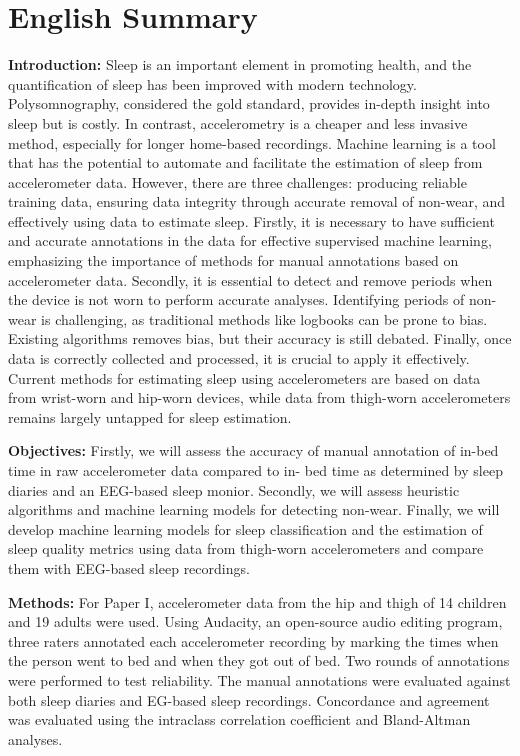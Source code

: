 \documentclass[
  10pt,
]{scrbook}
\let\originaltextbf\textbf
\renewcommand{\textbf}[1]{\textcolor{color1}{\textsf{\originaltextbf{#1}}}}
\begin{document}
\hypertarget{english-summary}{%
\chapter{English Summary}\label{english-summary}}

\textbf{Introduction:} Sleep is an important element in promoting
health, and the quantification of sleep has been improved with modern
technology. Polysomnography, considered the gold standard, provides
in-depth insight into sleep but is costly. In contrast, accelerometry is
a cheaper and less invasive method, especially for longer home-based
recordings. Machine learning is a tool that has the potential to
automate and facilitate the estimation of sleep from accelerometer data.
However, there are three challenges: producing reliable training data,
ensuring data integrity through accurate removal of non-wear, and
effectively using data to estimate sleep. Firstly, it is necessary to
have sufficient and accurate annotations in the data for effective
supervised machine learning, emphasizing the importance of methods for
manual annotations based on accelerometer data. Secondly, it is
essential to detect and remove periods when the device is not worn to
perform accurate analyses. Identifying periods of non-wear is
challenging, as traditional methods like logbooks can be prone to bias.
Existing algorithms removes bias, but their accuracy is still debated.
Finally, once data is correctly collected and processed, it is crucial
to apply it effectively. Current methods for estimating sleep using
accelerometers are based on data from wrist-worn and hip-worn devices,
while data from thigh-worn accelerometers remains largely untapped for
sleep estimation.

\textbf{Objectives:} Firstly, we will assess the accuracy of manual
annotation of in-bed time in raw accelerometer data compared to in- bed
time as determined by sleep diaries and an EEG-based sleep monior.
Secondly, we will assess heuristic algorithms and machine learning
models for detecting non-wear. Finally, we will develop machine learning
models for sleep classification and the estimation of sleep quality
metrics using data from thigh-worn accelerometers and compare them with
EEG-based sleep recordings.

\textbf{Methods:} For Paper I, accelerometer data from the hip and thigh
of 14 children and 19 adults were used. Using Audacity, an open-source
audio editing program, three raters annotated each accelerometer
recording by marking the times when the person went to bed and when they
got out of bed. Two rounds of annotations were performed to test
reliability. The manual annotations were evaluated against both sleep
diaries and EG-based sleep recordings. Concordance and agreement was
evaluated using the intraclass correlation coefficient and Bland-Altman
analyses.
\end{document}
